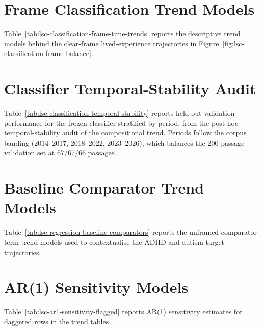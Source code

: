\renewcommand{\thesection}{A.\arabic{section}}
\renewcommand{\thetable}{A.\arabic{table}}
\renewcommand{\thefigure}{A.\arabic{figure}}
\section{Frame Classification Trend Models}

Table~\ref{tab:lsc-classification-frame-time-trends} reports the descriptive trend models behind the clear-frame lived-experience trajectories in Figure~\ref{fig:lsc-classification-frame-balance}.


\FloatBarrier

\Needspace{0.45\textheight}
\section{Classifier Temporal-Stability Audit}

Table~\ref{tab:lsc-classification-temporal-stability} reports held-out validation performance for the frozen classifier stratified by period, from the post-hoc temporal-stability audit of the compositional trend. Periods follow the corpus banding (2014--2017, 2018--2022, 2023--2026), which balances the 200-passage validation set at 67/67/66 passages.


\FloatBarrier

\Needspace{0.45\textheight}
\section{Baseline Comparator Trend Models}

Table~\ref{tab:lsc-regression-baseline-comparators} reports the unframed comparator-term trend models used to contextualise the ADHD and autism target trajectories.


\FloatBarrier

\Needspace{0.45\textheight}
\section{AR(1) Sensitivity Models}

Table~\ref{tab:lsc-ar1-sensitivity-flagged} reports AR(1) sensitivity estimates for daggered rows in the trend tables.

